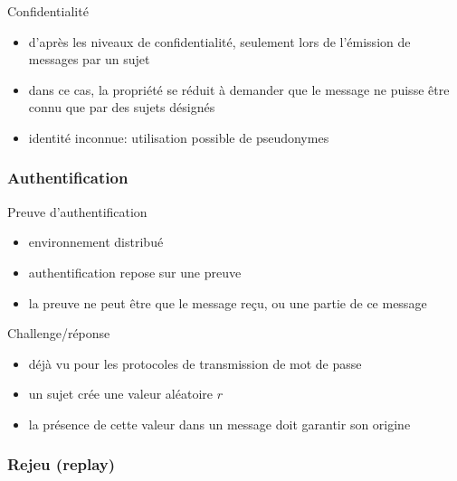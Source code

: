\begin{reveals}
\begin{frame}
  \vfill

  \begin{block}{Confidentialité}
    \begin{itemize}
    \item d'après les niveaux de confidentialité, seulement lors de 
      l'émission de messages par un sujet
    \item dans ce cas, la propriété se réduit à demander que le
      message ne puisse être connu que par des sujets désignés
    \item identité inconnue: utilisation possible de pseudonymes
    \end{itemize}
  \end{block}

  \vfill

   
\end{frame}



\begin{frame}
  \frametitle{Authentification}

  \vfill

  \begin{block}{Preuve d'authentification}
    \begin{itemize}
    \item environnement distribué
    \item authentification repose sur une preuve
    \item la preuve ne peut être que le message reçu, ou une partie de
      ce message
    \end{itemize}
  \end{block}

  \vfill
  \begin{block}{Challenge/réponse}
    \begin{itemize}
    \item déjà vu pour les protocoles de transmission de mot de passe
    \item un sujet crée une valeur aléatoire \(r\)
    \item la présence de cette valeur dans un message doit garantir
      son origine
    \end{itemize}
  \end{block}

  \vfill
   
\end{frame}

\begin{frame}
  \frametitle{Rejeu (replay)}


\end{frame}
\end{reveals}
